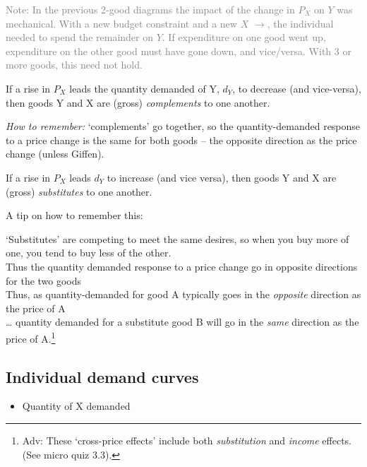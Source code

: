 \documentclass[]{article}
\providecommand{\tightlist}{%
  \setlength{\itemsep}{0pt}\setlength{\parskip}{0pt}}
\begin{document}
\textcolor{gray}{Note:  In the previous 2-good diagrams the impact of the change in $P_X$ on $Y$ was mechanical.
With a new budget constraint and a new $X$ $\rightarrow$, the individual needed to spend the remainder on $Y$. If expenditure on one good went up, expenditure on the other good must have gone down, and vice/versa.  With 3 or more goods, this need not hold.}

\begin{description}
\tightlist
\item[Complements]
If a rise in \(P_X\) leads the quantity demanded of Y, \(d_Y\), to
decrease (and vice-versa), then goods Y and X are (gross)
\emph{complements} to one another.
\end{description}

\emph{How to remember:} `complements' go together, so the
quantity-demanded response to a price change is the same for both goods
-- the opposite direction as the price change (unless Giffen).

\bigskip

\begin{description}
\tightlist
\item[Substitutes]
If a rise in \(P_X\) leads \(d_Y\) to increase (and vice versa), then
goods Y and X are (gross) \emph{substitutes} to one another.
\end{description}

A tip on how to remember this:

`Substitutes' are competing to meet the same desires, so when you buy
more of one, you tend to buy less of the other.\\
Thus the quantity demanded response to a price change go in opposite
directions for the two goods\\
Thus, as quantity-demanded for good A typically goes in the
\emph{opposite} direction as the price of A\\
\ldots{} quantity demanded for a substitute good B will go in the
\emph{same} direction as the price of A.\footnote{\textcolor{RawSienna}{Adv:}
  These `cross-price effects' include both \emph{substitution} and
  \emph{income} effects. (See micro quiz 3.3).}

\hypertarget{individual-demand-curves}{%
\subsection{Individual demand curves}\label{individual-demand-curves}}

\begin{itemize}
\tightlist
\item
  Quantity of X demanded
\end{itemize}
\end{document}
